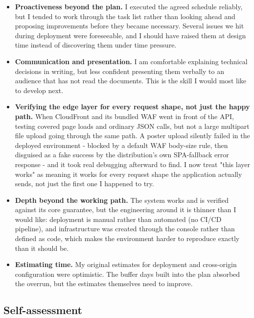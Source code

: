 \documentclass[a4paper,12pt]{article}
\begin{document}
\begin{itemize}
    \item \textbf{Proactiveness beyond the plan.} I executed the agreed schedule reliably, but I tended to work through the task list rather than looking ahead and proposing improvements before they became necessary. Several issues we hit during deployment were foreseeable, and I should have raised them at design time instead of discovering them under time pressure.
    \item \textbf{Communication and presentation.} I am comfortable explaining technical decisions in writing, but less confident presenting them verbally to an audience that has not read the documents. This is the skill I would most like to develop next.
    \item \textbf{Verifying the edge layer for every request shape, not just the happy path.} When CloudFront and its bundled WAF went in front of the API, testing covered page loads and ordinary JSON calls, but not a large multipart file upload going through the same path. A poster upload silently failed in the deployed environment - blocked by a default WAF body-size rule, then disguised as a fake success by the distribution's own SPA-fallback error response - and it took real debugging afterward to find. I now treat "this layer works" as meaning it works for every request shape the application actually sends, not just the first one I happened to try.
    \item \textbf{Depth beyond the working path.} The system works and is verified against its core guarantee, but the engineering around it is thinner than I would like: deployment is manual rather than automated (no CI/CD pipeline), and infrastructure was created through the console rather than defined as code, which makes the environment harder to reproduce exactly than it should be.
    \item \textbf{Estimating time.} My original estimates for deployment and cross-origin configuration were optimistic. The buffer days built into the plan absorbed the overrun, but the estimates themselves need to improve.
\end{itemize}

\subsection{Self-assessment}
\end{document}
